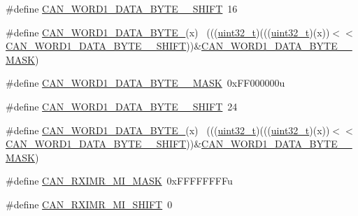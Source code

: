 \begin{DoxyCompactItemize}
\item 
\#define \hyperlink{group___c_a_n___register___masks_ga74e324a0ea45adbeeafd694ddebc4e02}{C\+A\+N\+\_\+\+W\+O\+R\+D1\+\_\+\+D\+A\+T\+A\+\_\+\+B\+Y\+T\+E\+\_\+\_\+\+S\+H\+I\+FT}~16
\item 
\#define \hyperlink{group___c_a_n___register___masks_gae9b2fe38e6639a4bac1a9f774bf4716c}{C\+A\+N\+\_\+\+W\+O\+R\+D1\+\_\+\+D\+A\+T\+A\+\_\+\+B\+Y\+T\+E\+\_}(x)                              ~(((\hyperlink{_p_e___types_8h_a33594304e786b158f3fb30289278f5af}{uint32\+\_\+t})(((\hyperlink{_p_e___types_8h_a33594304e786b158f3fb30289278f5af}{uint32\+\_\+t})(x))$<$$<$\hyperlink{group___c_a_n___register___masks_ga74e324a0ea45adbeeafd694ddebc4e02}{C\+A\+N\+\_\+\+W\+O\+R\+D1\+\_\+\+D\+A\+T\+A\+\_\+\+B\+Y\+T\+E\+\_\+\_\+\+S\+H\+I\+FT}))\&\hyperlink{group___c_a_n___register___masks_ga9762ba9b3f8288f68e3db1e0d2deccaf}{C\+A\+N\+\_\+\+W\+O\+R\+D1\+\_\+\+D\+A\+T\+A\+\_\+\+B\+Y\+T\+E\+\_\+\_\+\+M\+A\+SK})
\item 
\#define \hyperlink{group___c_a_n___register___masks_ga9330617952319833e6c0ccf8d115144b}{C\+A\+N\+\_\+\+W\+O\+R\+D1\+\_\+\+D\+A\+T\+A\+\_\+\+B\+Y\+T\+E\+\_\+\_\+\+M\+A\+SK}~0x\+F\+F000000u
\item 
\#define \hyperlink{group___c_a_n___register___masks_gaa7615281b358dfed5fb817b9c1fb157e}{C\+A\+N\+\_\+\+W\+O\+R\+D1\+\_\+\+D\+A\+T\+A\+\_\+\+B\+Y\+T\+E\+\_\+\_\+\+S\+H\+I\+FT}~24
\item 
\#define \hyperlink{group___c_a_n___register___masks_ga38ed4f81f5858160b669afb49724153f}{C\+A\+N\+\_\+\+W\+O\+R\+D1\+\_\+\+D\+A\+T\+A\+\_\+\+B\+Y\+T\+E\+\_}(x)                              ~(((\hyperlink{_p_e___types_8h_a33594304e786b158f3fb30289278f5af}{uint32\+\_\+t})(((\hyperlink{_p_e___types_8h_a33594304e786b158f3fb30289278f5af}{uint32\+\_\+t})(x))$<$$<$\hyperlink{group___c_a_n___register___masks_gaa7615281b358dfed5fb817b9c1fb157e}{C\+A\+N\+\_\+\+W\+O\+R\+D1\+\_\+\+D\+A\+T\+A\+\_\+\+B\+Y\+T\+E\+\_\+\_\+\+S\+H\+I\+FT}))\&\hyperlink{group___c_a_n___register___masks_ga9330617952319833e6c0ccf8d115144b}{C\+A\+N\+\_\+\+W\+O\+R\+D1\+\_\+\+D\+A\+T\+A\+\_\+\+B\+Y\+T\+E\+\_\+\_\+\+M\+A\+SK})
\item 
\#define \hyperlink{group___c_a_n___register___masks_ga3cef91282e43c8e5d2c30e65d375f964}{C\+A\+N\+\_\+\+R\+X\+I\+M\+R\+\_\+\+M\+I\+\_\+\+M\+A\+SK}~0x\+F\+F\+F\+F\+F\+F\+F\+Fu
\item 
\#define \hyperlink{group___c_a_n___register___masks_gae3dd7acc84e521ca0a05beb33f7b434c}{C\+A\+N\+\_\+\+R\+X\+I\+M\+R\+\_\+\+M\+I\+\_\+\+S\+H\+I\+FT}~0

\end{DoxyCompactItemize}
